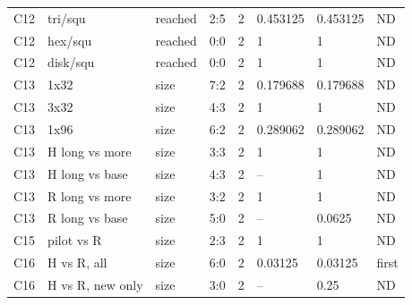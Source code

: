 \begin{table}[p]
{\begin{tabular}{lllrllll}
C12 & tri/squ & reached & 2:5 & 2 & 0.453125 & 0.453125 & ND\\
C12 & hex/squ & reached & 0:0 & 2 & 1 & 1 & ND\\
C12 & disk/squ & reached & 0:0 & 2 & 1 & 1 & ND\\
C13 & 1x32 & size & 7:2 & 2 & 0.179688 & 0.179688 & ND\\
C13 & 3x32 & size & 4:3 & 2 & 1 & 1 & ND\\
C13 & 1x96 & size & 6:2 & 2 & 0.289062 & 0.289062 & ND\\
C13 & H long vs more & size & 3:3 & 2 & 1 & 1 & ND\\
C13 & H long vs base & size & 4:3 & 2 & -- & 1 & ND\\
C13 & R long vs more & size & 3:2 & 2 & 1 & 1 & ND\\
C13 & R long vs base & size & 5:0 & 2 & -- & 0.0625 & ND\\
C15 & pilot vs R & size & 2:3 & 2 & 1 & 1 & ND\\
C16 & H vs R, all & size & 6:0 & 2 & 0.03125 & 0.03125 & first\\
C16 & H vs R, new only & size & 3:0 & 2 & -- & 0.25 & ND\\
\bottomrule\end{tabular}}
\end{table}\FloatBarrier
